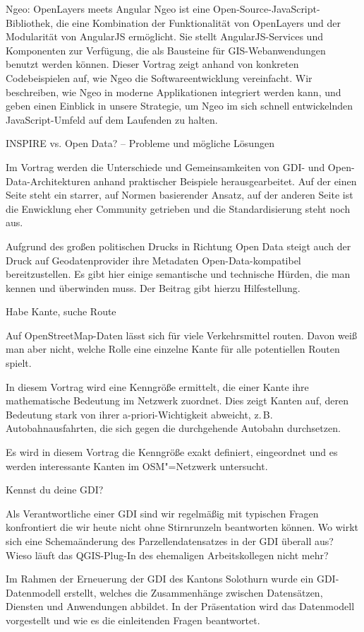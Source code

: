 \renewcommand{\konferenztag}{\donnerstag}
%
{Ngeo: OpenLayers meets Angular}%
{}%
{Ngeo ist eine Open-Source-JavaScript-Bibliothek, die eine Kombination der Funktionalität von
OpenLayers und der Modularität von AngularJS ermöglicht. Sie stellt AngularJS-Services und
Komponenten zur Verfügung, die als Bausteine für GIS-Webanwendungen benutzt werden können. Dieser
Vortrag zeigt anhand von konkreten Codebeispielen auf, wie Ngeo die Softwareentwicklung vereinfacht.
Wir beschreiben, wie Ngeo in moderne Applikationen integriert werden kann, und geben einen Einblick
in unsere Strategie, um Ngeo im sich schnell entwickelnden JavaScript-Umfeld auf dem Laufenden zu
halten.}


%
{INSPIRE vs. Open Data? -- Probleme und mögliche Lösungen}%
{}%
{Im Vortrag werden die Unterschiede und Gemeinsamkeiten von GDI- und Open-Data-Architekturen anhand
praktischer Beispiele herausgearbeitet. Auf der einen Seite steht ein starrer, auf Normen
basierender Ansatz, auf der anderen Seite ist die Enwicklung eher Community getrieben und die
Standardisierung steht noch aus.

Aufgrund des großen politischen Drucks in Richtung Open Data steigt
auch der Druck auf Geodatenprovider ihre Metadaten Open-Data-kompatibel bereitzustellen. Es gibt
hier einige semantische und technische Hürden, die man kennen und überwinden muss. Der Beitrag gibt
hierzu Hilfestellung.}

%
{Habe Kante, suche Route}%
{}%
{Auf OpenStreetMap-Daten lässt sich für viele Verkehrsmittel routen. Davon weiß man aber nicht,
  welche Rolle eine einzelne Kante für alle potentiellen Routen spielt.

In diesem Vortrag wird eine Kenngröße ermittelt, die einer Kante ihre mathematische Bedeutung im
Netzwerk zuordnet. Dies zeigt Kanten auf, deren Bedeutung stark von ihrer a-priori-Wichtigkeit
abweicht, z.\,B. Autobahnausfahrten, die sich gegen die durchgehende Autobahn durchsetzen.

Es wird in diesem Vortrag die Kenngröße exakt definiert, eingeordnet
und es werden interessante Kanten im OSM"=Netzwerk untersucht.
}

%
{Kennst du deine GDI?}%
{}%
{Als Verantwortliche einer GDI sind wir regelmäßig mit typischen Fragen konfrontiert die wir heute
  nicht ohne Stirnrunzeln beantworten können. Wo wirkt sich eine Schemaänderung des
  Parzellendatensatzes in der GDI überall aus? Wieso läuft das QGIS-Plug-In des ehemaligen
  Arbeitskollegen nicht mehr?

Im Rahmen der Erneuerung der GDI des Kantons Solothurn wurde ein GDI-Datenmodell erstellt, welches
die Zusammenhänge zwischen Datensätzen, Diensten und Anwendungen abbildet. In der Präsentation wird
das Datenmodell vorgestellt und wie es die einleitenden Fragen beantwortet.}

